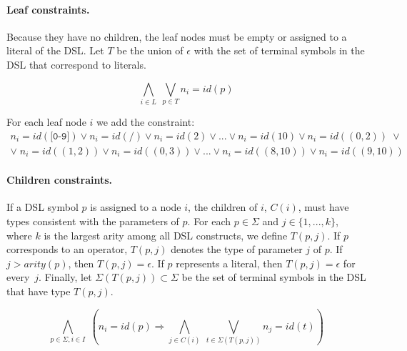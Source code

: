 \paragraph{Leaf constraints.} 
Because they have no children, the leaf nodes must be empty or assigned to a literal of the DSL.
Let \(T\) be the union of \(\epsilon\) with the set of terminal symbols in the DSL that correspond to literals.

\begin{equation}
    \bigwedge_{i \in L} \; \bigvee_{p \in T} n_i = id(p)
\end{equation}

\begin{example}\label{ex:leaf-constraints}
For each leaf node \(i\) we add the constraint:
\begin{gather*}
    n_i = id(\texttt{[0-9]}) \lor n_i = id(\texttt{/}) \lor n_i = id(2) \lor ... \lor n_i = id(10) \lor n_i = id((0,2)) \;\lor \\
    \lor\; n_i = id((1,2)) \lor  n_i = id((0,3)) \lor ... \lor  n_i = id((8,10))\lor  n_i = id((9,10)) 
\end{gather*}
\end{example}


\paragraph{Children constraints.}
If a DSL symbol \(p\) is assigned to a node \(i\), the children of \(i\), \(C(i)\), must have types consistent with the parameters of \(p\).
For each \(p \in \Sigma\) and \(j \in \{1, ..., k\}\), where \(k\) is the largest arity among all DSL constructs, we define \(T(p, j)\).
If \(p\) corresponds to an operator, \(T(p, j)\) denotes the type of parameter \(j\) of \(p\). If \({j > arity(p)}\), then \(T(p,j) = \epsilon\).
If \(p\) represents a literal, then \(T(p,j) = \epsilon\) for every~\(j\).
Finally, let \(\Sigma(T(p,j)) \subset \Sigma\) be the set of terminal symbols in the \ac{DSL} that have type \(T(p,j)\).

\begin{equation}
    \bigwedge_{p \in \Sigma, i \in I}\; \left(n_i = id(p) \Rightarrow \bigwedge_{j \in C(i)} \; \bigvee_{t \in \Sigma(T(p,j))} n_j = id(t) \right)
\end{equation}

